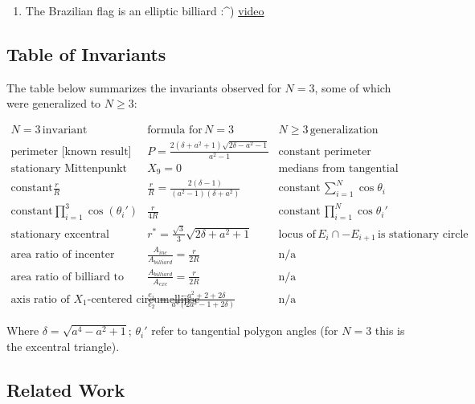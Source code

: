 \documentclass[]{article}
\providecommand{\tightlist}{%
  \setlength{\itemsep}{0pt}\setlength{\parskip}{0pt}}
\begin{document}
\begin{enumerate}
\def\labelenumi{\arabic{enumi}.}
\tightlist
\item
  The Brazilian flag is an elliptic billiard :\^{}) \href{https://www.youtube.com/watch?v=PHitZFbps8M}{video}
\end{enumerate}

\hypertarget{table-of-invariants}{%
\subsection{Table of Invariants}\label{table-of-invariants}}

The table below summarizes the invariants observed for \(N=3\), some of which were generalized to \(N\geq 3\):

\[
\begin{array}{r|l|l}
N=3\,\mbox{invariant}& \mbox{formula for}\,N=3 & N\geq3\,\mbox{generalization}  \\
\hline
\mbox{perimeter [known result]} & P=\frac{2(\delta+a^2+1)\sqrt{2\delta-a^2-1}}{a^2-1} & \mbox{constant perimeter} \\
\mbox{stationary Mittenpunkt} & X_9=0 & \mbox{medians from tangential vertices concur at origin} \\
\mbox{constant} \frac{r}{R} & \frac{r}{R}=\frac{2(\delta-1)}{(a^2-1)(\delta+a^2)} & \mbox{constant}\,\sum_{i=1}^N{\cos\theta_i} \\
\mbox{constant} \prod_{i=1}^{3}{\cos(\theta_i')} & \frac{r}{4R} & \mbox{constant}\,\prod_{i=1}^N{\cos\theta_i'} \\
\mbox{stationary excentral cosine circle} & r^*=\frac{\sqrt{3}}{3}\sqrt{2\delta+a^2+1} & \mbox{locus of}\,E_i\cap-E_{i+1}\,\mbox{is stationary circle} \\
\mbox{area ratio of incenter locus to billiard} & \frac{A_{inc}}{A_{billiard}} = \frac{r}{2R} & \mbox{n/a} \\
\mbox{area ratio of billiard to locus of excenters} & \frac{A_{billiard}}{A_{exc}} = \frac{r}{2R} & \mbox{n/a} \\
\mbox{axis ratio of }X_1\mbox{-centered circumellipse} & \frac{e_1}{e_2}=\frac{-a^2+2+2\delta}{a^4(2 a^2-1+2\delta)} & \mbox{n/a}
\end{array}
\]

Where \(\delta=\sqrt{a^4-a^2+1}\); \(\theta_i'\) refer to tangential polygon angles (for \(N=3\) this is the excentral triangle).

\hypertarget{related-work}{%
\subsection{Related Work}\label{related-work}}
\end{document}
